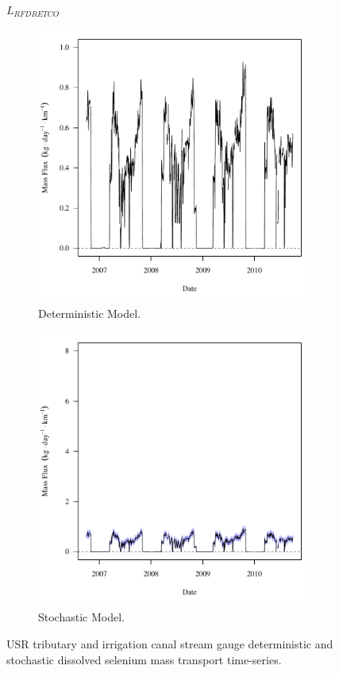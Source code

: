 \subfiguremid
\begin{landscape}
	\begin{figure}
		$ \displaystyle L_{RFDRETCO} $
		\begin{subfigure}{0.7\textwidth}
			\centering
			\includegraphics[width=\tableCustomSize]{"Figures/Results_USR/Deterministic/f RFR"}
			\caption{Deterministic Model.}
		\end{subfigure}%
		\begin{subfigure}{0.7\textwidth}
			\centering
			\includegraphics[width=\tableCustomSize]{"Figures/Results_USR/Stochastic/f RFR"}
			\caption{Stochastic Model.}
		\end{subfigure}
		\caption{USR tributary and irrigation canal stream gauge deterministic and stochastic dissolved selenium mass transport time-series.}
	\end{figure}
\end{landscape}
